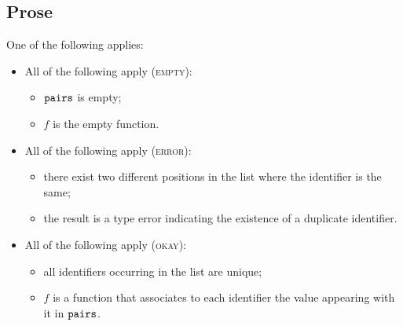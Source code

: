 \subsection{Prose}
One of the following applies:
\begin{itemize}
  \item All of the following apply (\textsc{empty}):
  \begin{itemize}
    \item $\texttt{pairs}$ is empty;
    \item $f$ is the empty function.
  \end{itemize}

  \item All of the following apply (\textsc{error}):
  \begin{itemize}
    \item there exist two different positions in the list where the identifier is the same;
    \item the result is a type error indicating the existence of a duplicate identifier.
  \end{itemize}

  \item All of the following apply (\textsc{okay}):
  \begin{itemize}
    \item all identifiers occurring in the list are unique;
    \item $f$ is a function that associates to each identifier the value appearing with it in $\texttt{pairs}$.
  \end{itemize}
\end{itemize}


\hypertarget{def-checknoduplicates}{}
